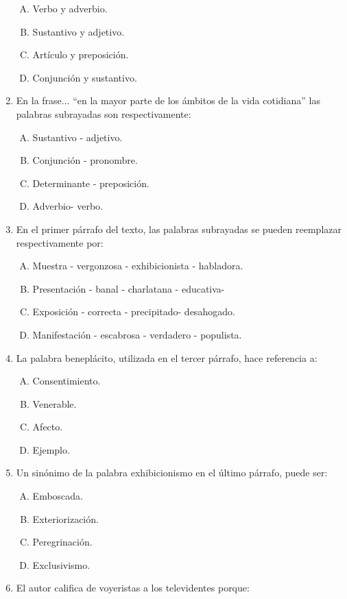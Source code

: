 \begin{enumerate}
\begin{enumerate}[(A)]
\item Verbo y adverbio.
\item Sustantivo y adjetivo.
\item Artículo y preposición.
\item Conjunción y sustantivo.
\end{enumerate}

\item  En la frase... ``en la mayor parte de los ámbitos de la vida cotidiana'' las palabras subrayadas son respectivamente:\label{lit-7}

\begin{enumerate}[(A)]
\item Sustantivo - adjetivo.
\item Conjunción - pronombre.
\item Determinante - preposición.
\item Adverbio- verbo.
\end{enumerate}
\item En el primer párrafo del texto, las palabras subrayadas se pueden reemplazar respectivamente por: \label{lit-8}

\begin{enumerate}[(A)]
\item Muestra - vergonzosa - exhibicionista - habladora. 
\item Presentación - banal - charlatana - educativa- 
\item Exposición - correcta - precipitado- desahogado.
\item Manifestación - escabrosa - verdadero - populista.
\end{enumerate}
\item La palabra beneplácito, utilizada en el tercer párrafo, hace referencia a: \label{lit-9}


\begin{enumerate}[(A)]
\item Consentimiento.
\item Venerable.
\item Afecto.
\item Ejemplo. 
\end{enumerate}
\item Un sinónimo de la palabra exhibicionismo en el último párrafo, puede ser: \label{lit-10}

\begin{enumerate}[(A)]
\item Emboscada.
\item Exteriorización.
\item Peregrinación.
\item Exclusivismo. 
\end{enumerate}
\item El autor califica de voyeristas a los televidentes porque: \label{lit-11}



\end{enumerate}
